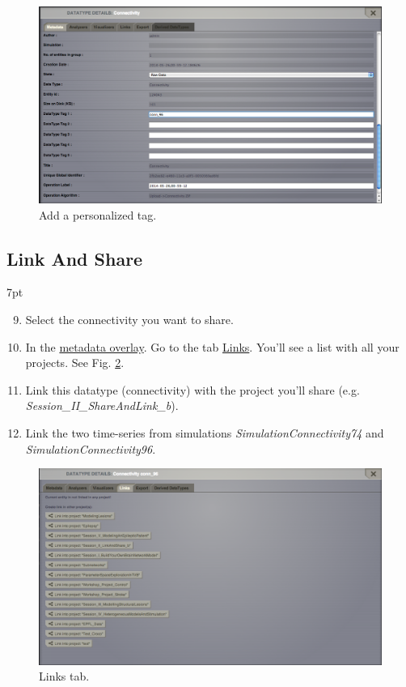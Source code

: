 \documentclass{tufte-handout}
\newenvironment{formal}{%
  \def\FrameCommand{%
    \hspace{1pt}%
    {\color{DarkBlue}\vrule width 2pt}%
    {\color{formalshade}\vrule width 4pt}%
    \colorbox{formalshade}%
  }%
  \MakeFramed{\advance\hsize-\width\FrameRestore}%
  \noindent\hspace{-4.55pt}%
  \begin{adjustwidth}{}{7pt}%
  \vspace{2pt}\vspace{2pt}%
}
{%
  \vspace{2pt}\end{adjustwidth}\endMakeFramed%
}
\begin{document}
\begin{figure}[h]
  \includegraphics[width=\linewidth]{Handout_UI_LinkAndShare_TagDatatype}%
  \caption{Add a personalized tag.}%
  \label{fig:tag}%
\end{figure}


\subsection{Link And Share}\label{sec:link_and_share}
\begin{formal}
\begin{enumerate}[resume]
\setcounter{enumi}{8}
\item Select the connectivity you want to share.
\item In the \underline{metadata overlay}. Go to the tab \underline{Links}. You'll see a list with all your projects. See Fig. \ref{fig:linkstab}.
\item Link this datatype (connectivity) with the project you'll share (e.g. \textit{Session\_II\_ShareAndLink\_b}).
\item Link the two time-series from simulations \textit{SimulationConnectivity74} and \textit{SimulationConnectivity96}.
\end{enumerate}
\end{formal} 

\begin{figure}[h]
  \includegraphics[width=\linewidth]{Handout_UI_LinkAndShare_LinksTab}%
  \caption{Links tab.}%
  \label{fig:linkstab}%
\end{figure}
\end{document}
